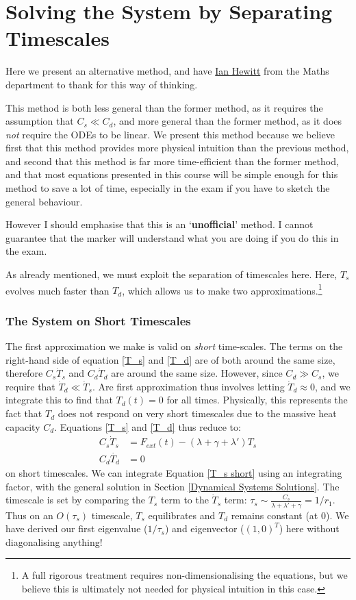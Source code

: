 \section{Solving the System by Separating Timescales}\label{Hewitt Method}

Here we present an alternative method, and have \href{https://people.maths.ox.ac.uk/hewitt/}{Ian Hewitt} from the Maths department to thank for this way of thinking. 

This method is both less general than the former method, as it requires the assumption that $C_s\ll C_d$, and more general than the former method, as it does \textit{not} require the ODEs to be linear. We present this method because we believe first that this method provides more physical intuition than the previous method, and second that this method is far more time-efficient than the former method, and that most equations presented in this course will be simple enough for this method to save a lot of time, especially in the exam if you have to sketch the general behaviour.

However I should emphasise that this is an `\textbf{unofficial}' method. I cannot guarantee that the marker will understand what you are doing if you do this in the exam.

As already mentioned, we must exploit the separation of timescales here. Here, $T_s$ evolves much faster than $T_d$, which allows us to make two approximations.\footnote{A full rigorous treatment requires non-dimensionalising the equations, but we believe this is ultimately not needed for physical intuition in this case.}

\subsubsection{The System on Short Timescales}

The first approximation we make is valid on \textit{short} time-scales. The terms on the right-hand side of equation \ref{T_s} and \ref{T_d} are of both around the same size, therefore $C_s\dot T_s$ and $C_d\dot T_d$ are around the same size. However, since $C_d\gg C_s$, we require that $\dot T_d\ll \dot T_s$. Are first approximation thus involves letting $\dot T_d\approx0$, and we integrate this to find that $T_d(t)=0$ for all times. Physically, this represents the fact that $T_d$ does not respond on very short timescales due to the massive heat capacity $C_d$. Equations \ref{T_s} and \ref{T_d} thus reduce to:
\begin{align}
    \label{T_s short}
    C_s\dot T_s &=F_{ext}(t)-(\lambda +\gamma+ \lambda')T_s\\ 
    \label{T_d short}
    C_d \dot{T_d} &= 0
\end{align}
on short timescales. We can integrate Equation \ref{T_s short} using an integrating factor, with the general solution in Section \ref{Dynamical Systems Solutions}. The timescale is set by comparing the $T_s$ term to the $\dot T_s$ term: $\tau_s\sim \frac{C_s}{\lambda+\lambda'+\gamma}=1/r_1$. Thus on an $O(\tau_s)$ timescale, $T_s$ equilibrates and $T_d$ remains constant (at $0$). We have derived our first eigenvalue ($1/\tau_s$) and eigenvector ($(1,0)^T$) here without diagonalising anything!

